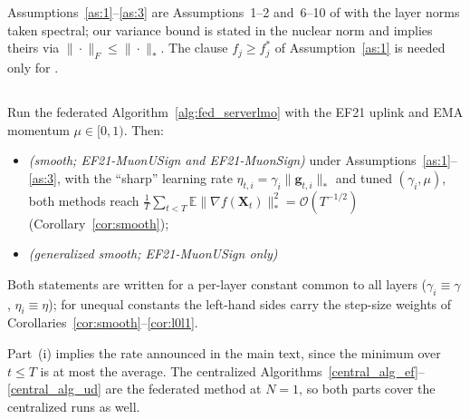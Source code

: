 Assumptions~\ref{as:1}--\ref{as:3} are Assumptions~1--2 and~6--10 of \citet{gruntkowska2025error} with the layer norms taken spectral; our variance bound is stated in the nuclear norm and implies theirs via $\|\cdot\|_F \le \|\cdot\|_{*}$. The clause $f_j \ge f_j^*$ of Assumption~\ref{as:1} is needed only for .

\subsection{}

\setcounter{theorem}{4}
\begin{theorem}\label{thm:conv}
Run the federated Algorithm~\ref{alg:fed_serverlmo} with the EF21 uplink and EMA momentum $\mu \in [0,1)$. Then:
\begin{itemize}
\item[\emph{(i)}] \emph{(smooth; EF21-MuonUSign and EF21-MuonSign)} under Assumptions~\ref{as:1}--\ref{as:3}, with the ``sharp'' learning rate $\eta_{t,i} = \gamma_i\|\mathbf{g}_{t,i}\|_{*}$ and tuned $(\gamma_i,\mu)$, both methods reach $\tfrac{1}{T}\sum_{t<T}\mathbb{E}\|\nabla f(\mathbf{X}_t)\|_*^2 = \mathcal{O}(T^{-1/2})$ (Corollary~\ref{cor:smooth});
\item[\emph{(ii)}] \emph{(generalized smooth; EF21-MuonUSign only)} 
\end{itemize}
Both statements are written for a per-layer constant common to all layers ($\gamma_i \equiv \gamma$, $\eta_i \equiv \eta$); for unequal constants the left-hand sides carry the step-size weights of Corollaries~\ref{cor:smooth}--\ref{cor:l0l1}.
\end{theorem}

Part~(i) implies the rate announced in the main text, since the minimum over $t\le T$ is at most the average. The centralized Algorithms~\ref{central_alg_ef}--\ref{central_alg_ud} are the federated method at $N=1$, so both parts cover the centralized runs as well. 

